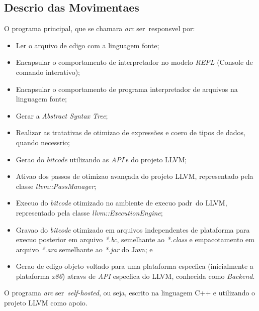 \subsection{Descri\ca o das Movimenta\co es}

\label{pro:movimentacoes}

O programa principal, que se chamara \emph{arc} ser\ah\ respons\ah vel por:
\begin{itemize}
  \item Ler o arquivo de c\oh digo com a linguagem fonte;
  \item Encapsular o comportamento de interpretador no modelo \emph{REPL} (Console de comando interativo);
  \item Encapsular o comportamento de programa interpretador de arquivos na linguagem fonte;
  \item Gerar a \emph{Abstract Syntax Tree};
  \item Realizar as tratativas de otimiza\ca o de express\~oes e coer\ca o de tipos de dados, quando necess\ah rio;
  \item Gera\ca o do \emph{bitcode} utilizando as \emph{API}'s do projeto LLVM;
  \item Ativa\ca o dos passos de otimiza\ca o avan\c{c}ada do projeto LLVM, representado pela classe \emph{llvm::PassManager};
  \item Execu\ca o do \emph{bitcode} otimizado no ambiente de execu\ca o padr\ao\ do LLVM, representado pela classe \emph{llvm::ExecutionEngine};
  \item Grava\ca o do \emph{bitcode} otimizado em arquivos independentes de plataforma para execu\ca o posterior em arquivo \emph{*.bc}, semelhante ao \emph{*.class} e empacotamento em arquivo \emph{*.ara} semelhante ao \emph{*.jar} do Java; e
  \item Gera\ca o de c\oh digo objeto voltado para uma plataforma espec\ih fica (inicialmente a plataforma \emph{x86}) atrav\eh s de \emph{API} espec\ih fica do LLVM, conhecida como \emph{Backend}.
\end{itemize}

O programa \emph{arc} ser\ah\ \emph{self-hosted}, ou seja, escrito na linguagem C++ e utilizando o projeto LLVM como apoio.
